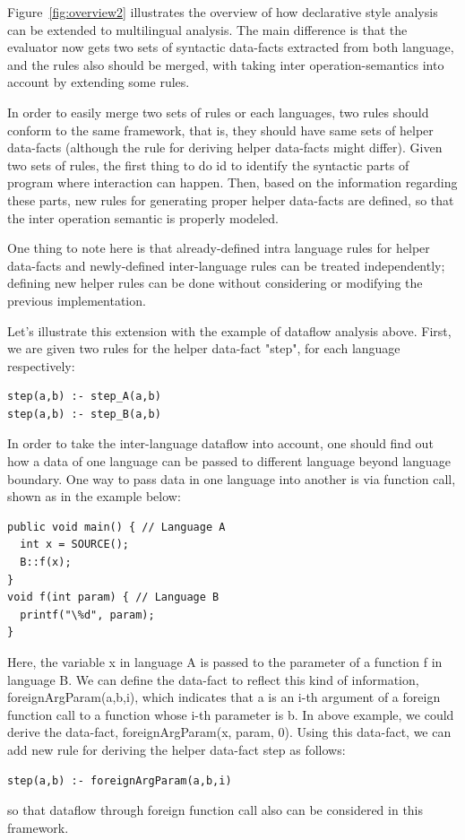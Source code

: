 Figure~\ref{fig:overview2} illustrates the overview of how declarative style analysis can be
extended to multilingual analysis. The main difference is that the evaluator
now gets two sets of syntactic data-facts extracted from both language, and the
rules also should be merged, with taking inter operation-semantics into account by
extending some rules.

In order to easily merge two sets of rules or each languages, two rules should
conform to the same framework, that is, they should have same sets of helper
data-facts (although the rule for deriving helper data-facts might differ).
Given two sets of rules, the first thing to do id to identify the syntactic
parts of program where interaction can happen.  Then, based on the information
regarding these parts, new rules for generating proper helper data-facts are
defined, so that the inter operation semantic is properly modeled.

One thing to note here is that already-defined intra language rules for helper
data-facts and newly-defined inter-language rules can be treated independently;
defining new helper rules can be done without considering or modifying the 
previous implementation.

Let's illustrate this extension with the example of dataflow analysis above.
First, we are given two rules for the helper data-fact "step", for each language
respectively:
\begin{lstlisting}[style=myDatalog,xleftmargin=2.5em]
step(a,b) :- step_A(a,b)
step(a,b) :- step_B(a,b)
\end{lstlisting}
In order to take the inter-language dataflow into account, one should find out
how a data of one language can be passed to different language beyond language
boundary.  One way to pass data in one language into another is via function
call, shown as in the example below:

\begin{lstlisting}[style=java,xleftmargin=2.5em]
public void main() { // Language A
  int x = SOURCE();
  B::f(x);
}
void f(int param) { // Language B
  printf("\%d", param);
}
\end{lstlisting}

Here, the variable x in language A is passed to the parameter of a function f
in language B. We can define the data-fact to reflect this kind of information,
foreignArgParam(a,b,i), which indicates that a is an i-th argument of a foreign
function call to a function whose i-th parameter is b. In above example, we
could derive the data-fact, foreignArgParam(x, param, 0). Using this data-fact,
we can add new rule for deriving the helper data-fact step as follows:
\begin{lstlisting}[style=myDatalog,xleftmargin=2.5em]
step(a,b) :- foreignArgParam(a,b,i)
\end{lstlisting}
so that dataflow through foreign function call also can be considered in this
framework.
